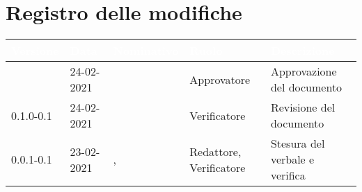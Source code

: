 \section*{Registro delle modifiche}
{
\setcounter{table}{-1}
{
\renewcommand{\arraystretch}{1.5}
\centering
\begin{longtable}{C{1.7cm} | C{2.5cm} | C{3.2cm} | C{2.7cm} | C{4.8cm}}
\textcolor{white}{\textbf{Versione}}&
\textcolor{white}{\textbf{Data}}&
\textcolor{white}{\textbf{Nominativo}}&
\textcolor{white}{\textbf{Ruolo}}&
\textcolor{white}{\textbf{Descrizione}}\\	
\endhead

\Versionedoc{} & 24-02-2021 & \Approvatore{} & Approvatore & Approvazione del documento\\	
0.1.0-0.1 & 24-02-2021 & \SH{} & Verificatore & Revisione del documento\\		
0.0.1-0.1 & 23-02-2021 & \Redattori{}, \RA{} & Redattore, Verificatore & Stesura del verbale e verifica\\
		
\end{longtable}
}
}
